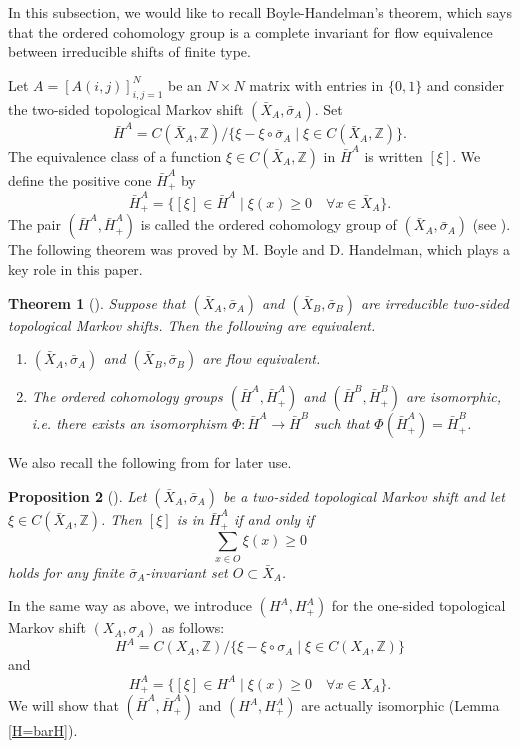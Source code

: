 \documentclass[11pt]{article}
\newtheorem{theorem}{Theorem}[section]
\newtheorem{proposition}[theorem]{Proposition}
\theoremstyle{definition}
\numberwithin{equation}{section}
\newcommand{\Z}{\mathbb{Z}}
\begin{document}
In this subsection, 
we would like to recall Boyle-Handelman's theorem, 
which says that the ordered cohomology group is a complete invariant 
for flow equivalence between irreducible shifts of finite type. 

Let $A=[A(i,j)]_{i,j=1}^N$ be an $N\times N$ matrix with entries in $\{0,1\}$ 
and consider the two-sided topological Markov shift $(\bar X_A,\bar\sigma_A)$. 
Set 
\[
\bar H^A
=C(\bar X_A,\Z)/\{\xi-\xi\circ\bar\sigma_A\mid\xi\in C(\bar X_A,\Z)\}. 
\]
The equivalence class of a function $\xi\in C(\bar X_A,\Z)$ in $\bar H^A$ 
is written $[\xi]$. 
We define the positive cone $\bar H^A_+$ by 
\[
\bar H^A_+=\{[\xi]\in\bar H^A
\mid\xi(x)\geq0\quad\forall x\in\bar X_A\}. 
\]
The pair $(\bar H^A,\bar H^A_+)$ is called 
the ordered cohomology group of $(\bar X_A,\bar\sigma_A)$ 
(see \cite[Section 1.3]{BH96Israel}). 
The following theorem was proved by M. Boyle and D. Handelman, 
which plays a key role in this paper. 

\begin{theorem}[{\cite[Theorem 1.12]{BH96Israel}}]\label{flow=barH}
Suppose that $(\bar X_A,\bar\sigma_A)$ and $(\bar X_B,\bar\sigma_B)$ are 
irreducible two-sided topological Markov shifts. 
Then the following are equivalent. 
\begin{enumerate}
\item $(\bar X_A,\bar\sigma_A)$ and $(\bar X_B,\bar\sigma_B)$ are 
flow equivalent. 
\item The ordered cohomology groups 
$(\bar H^A,\bar H^A_+)$ and $(\bar H^B,\bar H^B_+)$ are isomorphic, 
i.e. there exists an isomorphism 
$\Phi:\bar H^A\to\bar H^B$ such that $\Phi(\bar H^A_+)=\bar H^B_+$. 
\end{enumerate}
\end{theorem}

We also recall the following from \cite{BH96Israel} for later use. 

\begin{proposition}[{\cite[Proposition 3.13 (a)]{BH96Israel}}]
\label{whenpositive}
Let $(\bar X_A,\bar\sigma_A)$ be a two-sided topological Markov shift 
and let $\xi\in C(\bar X_A,\Z)$. 
Then $[\xi]$ is in $\bar H^A_+$ if and only if 
\[
\sum_{x\in O}\xi(x)\geq0
\]
holds for any finite $\bar\sigma_A$-invariant set $O\subset\bar X_A$. 
\end{proposition}

In the same way as above, we introduce $(H^A,H^A_+)$ 
for the one-sided topological Markov shift $(X_A,\sigma_A)$ as follows: 
\[
H^A=C(X_A,\Z)/\{\xi-\xi\circ\sigma_A\mid\xi\in C(X_A,\Z)\}
\]
and 
\[
H^A_+=\{[\xi]\in H^A\mid\xi(x)\geq0\quad\forall x\in X_A\}. 
\]
We will show that 
$(\bar H^A,\bar H^A_+)$ and $(H^A,H^A_+)$ are actually isomorphic 
(Lemma \ref{H=barH}). 
\end{document}
